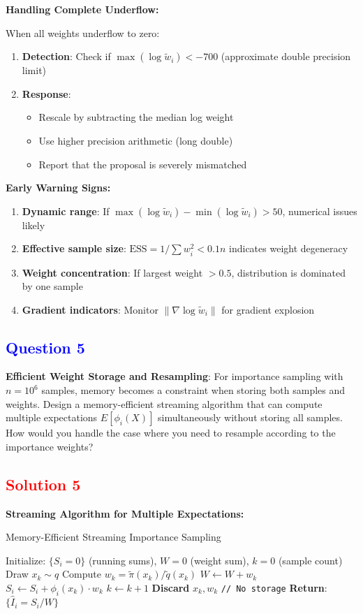 \documentclass[11pt]{article}
\newcommand{\question}[1]{\subsection*{\textcolor{blue}{Question #1}}}
\newcommand{\solution}[1]{\subsection*{\textcolor{red}{Solution #1}}}
\begin{document}
\textbf{Handling Complete Underflow:}

When all weights underflow to zero:
\begin{enumerate}
\item \textbf{Detection}: Check if $\max(\log \tilde{w}_i) < -700$ (approximate double precision limit)
\item \textbf{Response}: 
   \begin{itemize}
   \item Rescale by subtracting the median log weight
   \item Use higher precision arithmetic (long double)
   \item Report that the proposal is severely mismatched
   \end{itemize}
\end{enumerate}

\textbf{Early Warning Signs:}
\begin{enumerate}
\item \textbf{Dynamic range}: If $\max(\log \tilde{w}_i) - \min(\log \tilde{w}_i) > 50$, numerical issues likely
\item \textbf{Effective sample size}: $\text{ESS} = 1/\sum w_i^2 < 0.1n$ indicates weight degeneracy
\item \textbf{Weight concentration}: If largest weight $> 0.5$, distribution is dominated by one sample
\item \textbf{Gradient indicators}: Monitor $\|\nabla \log \tilde{w}_i\|$ for gradient explosion
\end{enumerate}

\question{5}
\textbf{Efficient Weight Storage and Resampling}: For importance sampling with $n = 10^6$ samples, memory becomes a constraint when storing both samples and weights. Design a memory-efficient streaming algorithm that can compute multiple expectations $E[\phi_i(X)]$ simultaneously without storing all samples. How would you handle the case where you need to resample according to the importance weights?

\solution{5}
\textbf{Streaming Algorithm for Multiple Expectations:}

\begin{algorithm}
\caption{Memory-Efficient Streaming Importance Sampling}
\begin{algorithmic}[1]
\STATE Initialize: $\{S_i = 0\}$ (running sums), $W = 0$ (weight sum), $k = 0$ (sample count)
    \STATE Draw $x_k \sim q$
    \STATE Compute $w_k = \tilde{\pi}(x_k)/\tilde{q}(x_k)$
    \STATE $W \gets W + w_k$
        \STATE $S_i \gets S_i + \phi_i(x_k) \cdot w_k$
    \ENDFOR
    \STATE $k \gets k + 1$
    \STATE \textbf{Discard} $x_k, w_k$ \texttt{// No storage}
\ENDWHILE
\STATE \textbf{Return}: $\{\hat{I}_i = S_i/W\}$
\end{algorithmic}
\end{algorithm}
\end{document}
